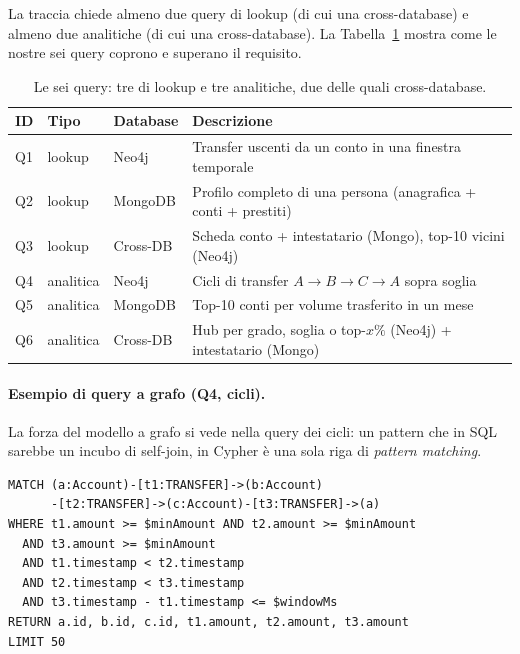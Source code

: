 \documentclass[11pt,a4paper]{article}
\begin{document}
La traccia chiede almeno due query di lookup (di cui una cross-database) e almeno
due analitiche (di cui una cross-database). La Tabella~\ref{tab:query-class}
mostra come le nostre sei query coprono e superano il requisito.

\begin{table}[h]
\centering
\small
\begin{tabular}{llll}
\toprule
\textbf{ID} & \textbf{Tipo} & \textbf{Database} & \textbf{Descrizione} \\
\midrule
Q1 & lookup    & Neo4j     & Transfer uscenti da un conto in una finestra temporale \\
Q2 & lookup    & MongoDB   & Profilo completo di una persona (anagrafica + conti + prestiti) \\
Q3 & lookup    & Cross-DB  & Scheda conto + intestatario (Mongo), top-10 vicini (Neo4j) \\
Q4 & analitica & Neo4j     & Cicli di transfer $A\to B\to C\to A$ sopra soglia \\
Q5 & analitica & MongoDB   & Top-10 conti per volume trasferito in un mese \\
Q6 & analitica & Cross-DB  & Hub per grado, soglia o top-$x\%$ (Neo4j) + intestatario (Mongo) \\
\bottomrule
\end{tabular}
\caption{Le sei query: tre di lookup e tre analitiche, due delle quali cross-database.}
\label{tab:query-class}
\end{table}

\paragraph{Esempio di query a grafo (Q4, cicli).} La forza del modello a grafo
si vede nella query dei cicli: un pattern che in SQL sarebbe un incubo di
self-join, in Cypher \`e una sola riga di \emph{pattern matching}.

\begin{lstlisting}[style=plain,caption={Q4 -- ricerca di cicli a tre passi in Cypher.},captionpos=b]
MATCH (a:Account)-[t1:TRANSFER]->(b:Account)
      -[t2:TRANSFER]->(c:Account)-[t3:TRANSFER]->(a)
WHERE t1.amount >= $minAmount AND t2.amount >= $minAmount
  AND t3.amount >= $minAmount
  AND t1.timestamp < t2.timestamp
  AND t2.timestamp < t3.timestamp
  AND t3.timestamp - t1.timestamp <= $windowMs
RETURN a.id, b.id, c.id, t1.amount, t2.amount, t3.amount
LIMIT 50
\end{lstlisting}
\end{document}
